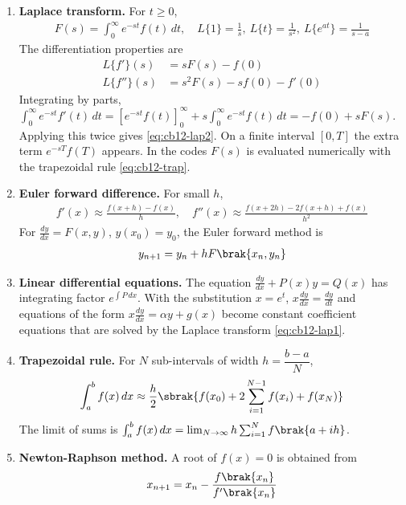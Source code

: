 \begin{enumerate}[label=\thesubsection.\arabic*, ref=\thesubsection.\theenumi,itemsep=0pt]
\item \textbf{Laplace transform.} For $t \ge 0$,
\begin{align}
F(s) = \int_0^{\infty} e^{-st}f(t)\,dt, \quad L\{1\} = \frac{1}{s},\ L\{t\} = \frac{1}{s^2},\ L\{e^{at}\} = \frac{1}{s-a}
\label{eq:cb12-laplace}
\end{align}
The differentiation properties are
\begin{align}
L\{f'\}(s) &= sF(s) - f(0) \label{eq:cb12-lap1}\\
L\{f''\}(s) &= s^2F(s) - sf(0) - f'(0) \label{eq:cb12-lap2}
\end{align}
\solution Integrating by parts, $\int_0^\infty e^{-st}f'(t)\,dt = \left[e^{-st}f(t)\right]_0^\infty + s\int_0^\infty e^{-st}f(t)\,dt = -f(0) + sF(s)$. Applying this twice gives \eqref{eq:cb12-lap2}. On a finite interval $[0,T]$ the extra term $e^{-sT}f(T)$ appears. In the codes $F(s)$ is evaluated numerically with the trapezoidal rule \eqref{eq:cb12-trap}.

\item \textbf{Euler forward difference.} For small $h$,
\begin{align}
f'(x) \approx \frac{f(x+h) - f(x)}{h}, \quad f''(x) \approx \frac{f(x+2h) - 2f(x+h) + f(x)}{h^2}
\label{eq:cb12-euler-diff}
\end{align}
For $\frac{dy}{dx} = F(x,y)$, $y(x_0) = y_0$, the Euler forward method is
\begin{align}
y_{n+1} = y_n + hF\brak{x_n, y_n}
\label{eq:cb12-euler}
\end{align}

\item \textbf{Linear differential equations.} The equation $\frac{dy}{dx} + P(x)y = Q(x)$ has integrating factor $e^{\int P\,dx}$. With the substitution $x = e^t$, $x\frac{dy}{dx} = \frac{dy}{dt}$ and equations of the form $x\frac{dy}{dx} = \alpha y + g(x)$ become constant coefficient equations that are solved by the Laplace transform \eqref{eq:cb12-lap1}.
\label{eq:cb12-linode}

\item \textbf{Trapezoidal rule.} For $N$ sub-intervals of width $h = \dfrac{b-a}{N}$,
\begin{align}
\int_a^b f(x)\,dx \approx \frac{h}{2}\sbrak{f(x_0) + 2\sum_{i=1}^{N-1}f(x_i) + f(x_N)}
\label{eq:cb12-trap}
\end{align}
The limit of sums is $\int_a^b f(x)\,dx = \lim_{N\to\infty}h\sum_{i=1}^{N}f\brak{a + ih}$.

\item \textbf{Newton-Raphson method.} A root of $f(x) = 0$ is obtained from
\begin{align}
x_{n+1} = x_n - \frac{f\brak{x_n}}{f'\brak{x_n}}
\label{eq:cb12-nr}
\end{align}


\end{enumerate}
